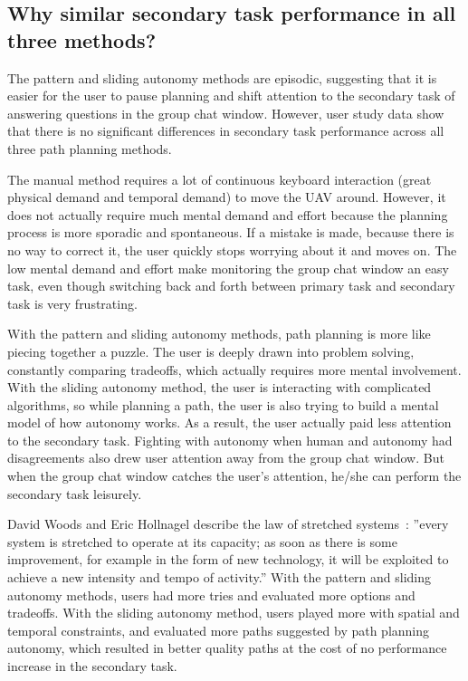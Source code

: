 \subsection{Why similar secondary task performance in all three methods?}

The pattern and sliding autonomy methods are episodic, suggesting that it is easier for the user to pause planning and shift attention to the secondary task of answering questions in the group chat window. However, user study data show that there is no significant differences in secondary task performance across all three path planning methods.

The manual method requires a lot of continuous keyboard interaction (great physical demand and temporal demand) to move the UAV around. However, it does not actually require much mental demand and effort because the planning process is more sporadic and spontaneous. If a mistake is made, because there is no way to correct it, the user quickly stops worrying about it and moves on. The low mental demand and effort make monitoring the group chat window an easy task, even though switching back and forth between primary task and secondary task is very frustrating.

With the pattern and sliding autonomy methods, path planning is more like piecing together a puzzle. The user is deeply drawn into problem solving, constantly comparing tradeoffs, which actually requires more mental involvement. With the sliding autonomy method, the user is interacting with complicated algorithms, so while planning a path, the user is also trying to build a mental model of how autonomy works. As a result, the user actually paid less attention to the secondary task. Fighting with autonomy when human and autonomy had disagreements also drew user attention away from the group chat window. But when the group chat window catches the user's attention, he/she can perform the secondary task leisurely.

David Woods and Eric Hollnagel describe the law of stretched systems~\cite{Woods2006Joint}: ''every system is stretched to operate at its capacity; as soon as there is some improvement, for example in the form of new technology, it will be exploited to achieve a new intensity and tempo of activity.'' With the pattern and sliding autonomy methods, users had more tries and evaluated more options and tradeoffs. With the sliding autonomy method, users played more with spatial and temporal constraints, and evaluated more paths suggested by path planning autonomy, which resulted in better quality paths at the cost of no performance increase in the secondary task.


